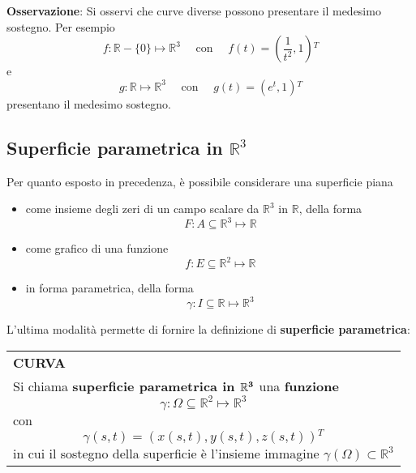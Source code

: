 \documentclass[a4paper]{extarticle}
\renewcommand\arraystretch{}
\begin{document}
\vspace{1em}
\noindent
\textbf{Osservazione}: Si osservi che curve diverse possono presentare il medesimo sostegno. Per esempio
\[f : \mathbb{R} - \{0\} \longmapsto \mathbb{R}^3 \hspace{1em} \text{ con } \hspace{1em} f(t)=\left(\frac{1}{t^2},1\right){^T}\]
e
\[g : \mathbb{R} \longmapsto \mathbb{R}^3 \hspace{1em} \text{ con } \hspace{1em} g(t)=\left(e^t,1\right){^T}\]
presentano il medesimo sostegno.

\vspace{1em}
\noindent
\subsection{Superficie parametrica in $\mathbb{R}^3$}
Per quanto esposto in precedenza, è possibile considerare una superficie piana
\begin{itemize}
    \item come insieme degli zeri di un campo scalare da $\mathbb{R}^3$ in $\mathbb{R}$, della forma
    \[F : A \subseteq \mathbb{R}^3 \longmapsto \mathbb{R}\]
    \item come grafico di una funzione
    \[f : E \subseteq \mathbb{R}^2 \longmapsto \mathbb{R}\]
    \item in forma parametrica, della forma
    \[\gamma : I \subseteq \mathbb{R} \longmapsto \mathbb{R}^3\]
\end{itemize}
L'ultima modalità permette di fornire la definizione di \textbf{superficie parametrica}:

\vspace{1em}
\setlength{\tabcolsep}{14pt}
\renewcommand{\arraystretch}{2}
\noindent
\begin{tabularx}{\textwidth}{@{}|P|@{}}
    \hline
    {\textbf{CURVA}}\\
    \parbox{\linewidth}{Si chiama \textbf{superficie parametrica in $\bf{\mathbb{R}^3}$} una \textbf{funzione}
    \[\gamma : \Omega \subseteq \mathbb{R}^2 \longmapsto \mathbb{R}^3\]
    con
    \[\gamma(s,t) = \left(x(s,t),y(s,t),z(s,t)\right){^T}\]
    in cui il sostegno della superficie è l'insieme immagine $\gamma(\Omega) \subset \mathbb{R}^3$ \vspace{3mm}}\\
    \hline
\end{tabularx}
\end{document}
